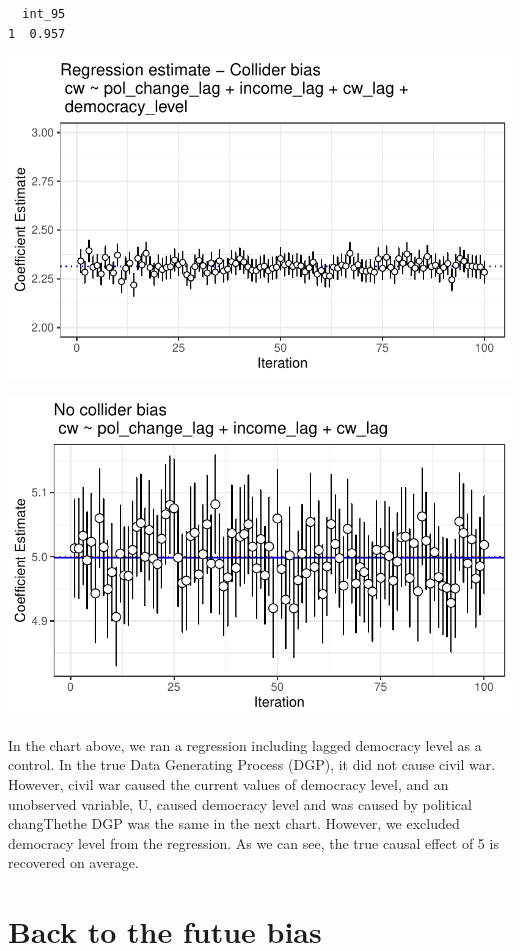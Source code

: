 \documentclass[
  super,
  preprint,
  3p]{elsarticle}
\begin{document}
\begin{verbatim}
  int_95
1  0.957
\end{verbatim}

\includegraphics{Papers_beware_collider_files/figure-pdf/simulation 2-1.pdf}

\includegraphics{Papers_beware_collider_files/figure-pdf/simulation 2-2.pdf}

In the chart above, we ran a regression including lagged democracy level
as a control. In the true Data Generating Process (DGP), it did not
cause civil war. However, civil war caused the current values of
democracy level, and an unobserved variable, U, caused democracy level
and was caused by political changThethe DGP was the same in the next
chart. However, we excluded democracy level from the regression. As we
can see, the true causal effect of 5 is recovered on average.

\hypertarget{back-to-the-futue-bias}{%
\section{Back to the futue bias}\label{back-to-the-futue-bias}}
\end{document}
